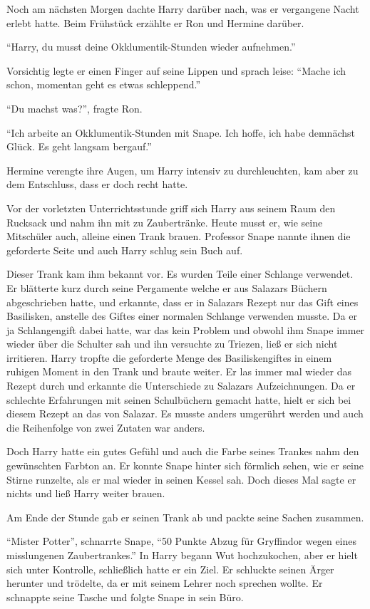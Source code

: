 Noch am nächsten Morgen dachte Harry darüber nach, was er vergangene Nacht erlebt hatte. Beim Frühstück erzählte er Ron und Hermine darüber.

\enquote{Harry, du musst deine Okklumentik-Stunden wieder aufnehmen.}

Vorsichtig legte er einen Finger auf seine Lippen und sprach leise: \enquote{Mache ich schon, momentan geht es etwas schleppend.}

\enquote{Du machst was?}, fragte Ron.

\enquote{Ich arbeite an Okklumentik-Stunden mit Snape. Ich hoffe, ich habe demnächst Glück. Es geht langsam bergauf.}

Hermine verengte ihre Augen, um Harry intensiv zu durchleuchten, kam aber zu dem Entschluss, dass er doch recht hatte.

Vor der vorletzten Unterrichtsstunde griff sich Harry aus seinem Raum den Rucksack und nahm ihn mit zu Zaubertränke. Heute musst er, wie seine Mitschüler auch, alleine einen Trank brauen. Professor Snape nannte ihnen die geforderte Seite und auch Harry schlug sein Buch auf.

Dieser Trank kam ihm bekannt vor. Es wurden Teile einer Schlange verwendet. Er blätterte kurz durch seine Pergamente welche er aus Salazars Büchern abgeschrieben hatte, und erkannte, dass er in Salazars Rezept nur das Gift eines Basilisken, anstelle des Giftes einer normalen Schlange verwenden musste. Da er ja Schlangengift dabei hatte, war das kein Problem und obwohl ihm Snape immer wieder über die Schulter sah und ihn versuchte zu Triezen, ließ er sich nicht irritieren. Harry tropfte die geforderte Menge des Basiliskengiftes in einem ruhigen Moment in den Trank und braute weiter. Er las immer mal wieder das Rezept durch und erkannte die Unterschiede zu Salazars Aufzeichnungen. Da er schlechte Erfahrungen mit seinen Schulbüchern gemacht hatte, hielt er sich bei diesem Rezept an das von Salazar. Es musste anders umgerührt werden und auch die Reihenfolge von zwei Zutaten war anders.

Doch Harry hatte ein gutes Gefühl und auch die Farbe seines Trankes nahm den gewünschten Farbton an. Er konnte Snape hinter sich förmlich sehen, wie er seine Stirne runzelte, als er mal wieder in seinen Kessel sah. Doch dieses Mal sagte er nichts und ließ Harry weiter brauen.

Am Ende der Stunde gab er seinen Trank ab und packte seine Sachen zusammen.

\enquote{Mister Potter}, schnarrte Snape, \enquote{50 Punkte Abzug für Gryffindor wegen eines misslungenen Zaubertrankes.} In Harry begann Wut hochzukochen, aber er hielt sich unter Kontrolle, schließlich hatte er ein Ziel. Er schluckte seinen Ärger herunter und trödelte, da er mit seinem Lehrer noch sprechen wollte. Er schnappte seine Tasche und folgte Snape in sein Büro.

